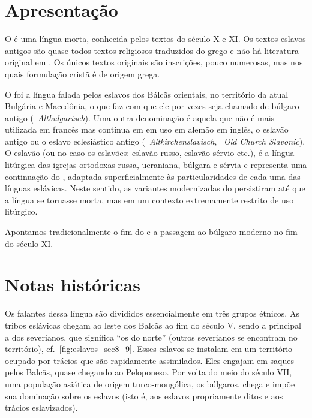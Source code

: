 
\section{Apresentação}

O  é uma língua morta, conhecida pelos textos do século X e XI\@.
Os textos eslavos antigos são quase todos textos religiosos traduzidos do grego
e não há literatura original em .
Os únicos textos originais são inscrições, pouco numerosas, mas nos quais
formulação cristã é de origem grega.

O  foi a língua falada pelos eslavos dos Bálcãs orientais, no
território da atual Bulgária e Macedônia, o que faz com que ele por vezes seja
chamado de búlgaro antigo (~\emph{Altbulgarisch}).
Uma outra denominação é aquela que não é mais utilizada em francês mas continua
em em uso em alemão em inglês, o eslavão antigo ou o eslavo eclesiástico antigo
(~\emph{Altkirchenslavisch}, ~\emph{Old Church Slavonic}).
O eslavão (ou no caso os eslavões: eslavão russo, eslavão sérvio etc.), é a
língua litúrgica das igrejas ortodoxas russa, ucraniana, búlgara e sérvia e
representa uma continuação do , adaptada superficialmente às
particularidades de cada uma das línguas eslávicas.
Neste sentido, as variantes modernizadas do  persistiram até que a
língua se tornasse morta, mas em um contexto extremamente restrito de uso
litúrgico.

Apontamos tradicionalmente o fim do  e a passagem ao búlgaro
moderno no fim do século XI\@.

\section{Notas históricas}

Os falantes dessa língua são divididos essencialmente em três grupos étnicos.
As tribos eslávicas chegam ao leste dos Balcãs ao fim do século V, sendo a
principal a dos severianos, que significa ``os do norte'' (outros severianos se
encontram no território), cf.~\autoref{fig:eslavos_sec8_9}.
Esses eslavos se instalam em um território ocupado por trácios que são
rapidamente assimilados.
Eles engajam em saques pelos Balcãs, quase chegando ao Peloponeso.
Por volta do meio do século VII, uma população asiática de origem
turco-mongólica, os búlgaros, chega e impõe sua dominação sobre os eslavos (isto
é, aos eslavos propriamente ditos e aos trácios eslavizados).

